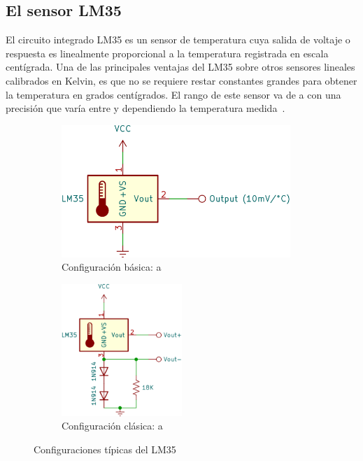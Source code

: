 %
%

\subsection{El sensor LM35}%
\label{sec:intro-lm35}
El circuito integrado LM35 es un sensor de temperatura cuya salida de voltaje o respuesta es linealmente proporcional a la temperatura registrada en escala centígrada.
Una de las principales ventajas del LM35 sobre otros sensores lineales calibrados en Kelvin, es que no se requiere restar constantes grandes para obtener la temperatura en grados centígrados.
El rango de este sensor va de  a  con una precisión que varía entre  y  dependiendo la temperatura medida~.

\begin{figure}
	\centering
	\begin{subfigure}[b]{0.5\columnwidth}
		\centering
		\includegraphics[width=\textwidth,height=5cm,keepaspectratio]{img/lm35a.png}
		\caption{Configuración básica:  a }
		\label{fig:lm35config-a} %
	\end{subfigure}%
	\begin{subfigure}[b]{0.5\columnwidth}
		\centering
		\includegraphics[width=\textwidth,height=5cm,keepaspectratio]{img/lm35b.png}
		\caption{Configuración clásica:  a }
		\label{fig:lm35config-b} %
	\end{subfigure}
	\caption{Configuraciones típicas del LM35}
	\label{fig:lm35config} %
\end{figure}

